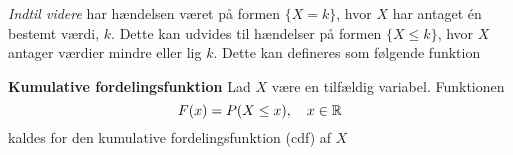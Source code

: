 \begin{eks}

\end{eks}


\textit{Indtil videre} har hændelsen været på formen $\{X=k\}$, hvor $X$ har antaget én bestemt værdi, $k$. Dette kan udvides til hændelser på formen $\{X\leq k\}$, hvor $X$ antager værdier mindre eller lig $k$. Dette kan defineres som følgende funktion

\begin{minipage}\textwidth
\begin{defn}\textbf{Kumulative fordelingsfunktion} %
\newline
Lad $X$ være en tilfældig variabel. Funktionen 
$$F(x)=P(X\leq x), \quad x\in\mathbb{R}$$
kaldes for den kumulative fordelingsfunktion (cdf) af $X$
\end{defn}
\end{minipage}



